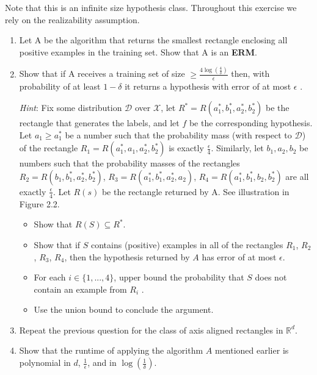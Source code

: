 \documentclass[]{book}
\theoremstyle{definition}
\begin{document}
Note that this is an infinite size hypothesis class. Throughout this exercise we rely
on the realizability assumption.

\begin{enumerate}
    \item Let A be the algorithm that returns the smallest rectangle enclosing all positive
examples in the training set. Show that A is an \textbf{ERM}.
\item Show that if A receives a training set of size $\geq \frac{4 \log (\frac{4}{\delta}) }{\epsilon}$ then, with probability of at least $1-\delta$ it returns a hypothesis with error of at most $\epsilon$ .

\textit{Hint}: Fix some distribution $\mathcal{D}$ over $\mathcal{X}$, let $R^*=R(a_1^*,b_1^*,a_2^*,b_2^*)$ be the rectangle that generates the labels, and let $f$ be the corresponding hypothesis. Let $a_1 \geq a_1^*$ be a number such that the probability mass (with respect to $\mathcal{D}$) of the rectangle $R_1=R(a_1^*,a_1,a_2^*,b_2^*)$ is exactly $\frac{\epsilon}{4}$. Similarly, let $b_1,a_2,b_2$ be numbers such that the probability masses of the rectangles $R_2=R(b_1,b_1^*,a_2^*,b_2^*)$, $R_3=R(a_1^*,b_1^*,a_2^*,a_2)$, $R_4=R(a_1^*,b_1^*,b_2,b_2^*)$ are all exactly $\frac{\epsilon}{4}$. Let $R(s)$ be the rectangle returned by A. See illustration in Figure 2.2.
\begin{itemize}
    \item Show that $R(S)\subseteq R^*$.
    \item Show that if $S$ contains (positive) examples in all of the rectangles $R_1$, $R_2$, $R_3$, $R_4$, then the hypothesis returned by $A$ has error of at most $\epsilon$.
    \item For each $i\in \{1,...,4\}$, upper bound the probability that $S$ does not contain an example from $R_i$ .
    \item Use the union bound to conclude the argument.
\end{itemize}
\item Repeat the previous question for the class of axis aligned rectangles in $\mathbb{R}^d$.
\item Show that the runtime of applying the algorithm $A$ mentioned earlier is polynomial in $d$, $\frac{1}{\epsilon}$, and in $\log \left ( \frac{1}{\delta} \right )$.
\end{enumerate}
\end{document}
